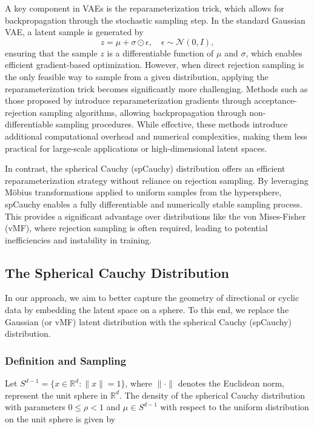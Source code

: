 \documentclass{article}
\begin{document}
A key component in VAEs is the reparameterization trick, which allows for backpropagation through the stochastic sampling step. In the standard Gaussian VAE, a latent sample is generated by
\[
z = \mu + \sigma \odot \epsilon, \quad \epsilon \sim \mathcal{N}(0,I),
\]
ensuring that the sample \(z\) is a differentiable function of \(\mu\) and \(\sigma\), which enables efficient gradient-based optimization. However, when direct rejection sampling is the only feasible way to sample from a given distribution, applying the reparameterization trick becomes significantly more challenging. Methods such as those proposed by \cite{Naesseth} introduce reparameterization gradients through acceptance-rejection sampling algorithms, allowing backpropagation through non-differentiable sampling procedures. While effective, these methods introduce additional computational overhead and numerical complexities, making them less practical for large-scale applications or high-dimensional latent spaces. 

In contrast, the spherical Cauchy (spCauchy) distribution offers an efficient reparameterization strategy without reliance on rejection sampling. By leveraging Möbius transformations applied to uniform samples from the hypersphere, spCauchy enables a fully differentiable and numerically stable sampling process. This provides a significant advantage over distributions like the von Mises-Fisher (vMF), where rejection sampling is often required, leading to potential inefficiencies and instability in training. 

\subsection{The Spherical Cauchy Distribution}

In our approach, we aim to better capture the geometry of directional or cyclic data by embedding the latent space on a sphere. To this end, we replace the Gaussian (or vMF) latent distribution with the spherical Cauchy (spCauchy) distribution.

\subsubsection{Definition and Sampling}

Let \( S^{d-1} = \{ x \in \mathbb{R}^d : \|x\| = 1 \} \), where \( \| \cdot \| \) denotes the Euclidean norm, represent the unit sphere in \( \mathbb{R}^d \). The density of the spherical Cauchy distribution with parameters \( 0 \leq \rho < 1 \) and \( \mu \in S^{d-1} \) with respect to the uniform distribution on the unit sphere is given by
\end{document}
